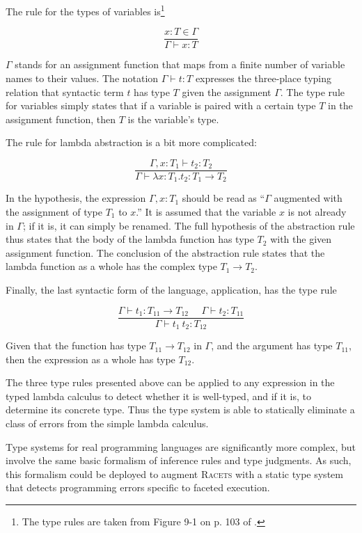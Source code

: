 \documentclass{article}
\begin{document}
The rule for the types of variables is\footnote{The type rules are taken from Figure 9-1 on p. 103 of \cite{types}.}

\[
\frac{x : T \in \Gamma}
{\Gamma \vdash x : T}
\]

$\Gamma$ stands for an assignment function that maps from a finite number of variable names to their values. The notation $\Gamma \vdash t : T$ expresses the three-place typing relation that syntactic term $t$ has type $T$ given the assignment $\Gamma$. The type rule for variables simply states that if a variable is paired with a certain type $T$ in the assignment function, then $T$ is the variable's type.

The rule for lambda abstraction is a bit more complicated:

\[
\frac{\Gamma, x : T_1 \vdash t_2 : T_2}
{\Gamma \vdash \lambda x : T_1 . t_2 : T_1 \to T_2}
\]

In the hypothesis, the expression $\Gamma, x : T_1$ should be read as ``$\Gamma$ augmented with the assignment of type $T_1$ to $x$.'' It is assumed that the variable $x$ is not already in $\Gamma$; if it is, it can simply be renamed. The full hypothesis of the abstraction rule thus states that the body of the lambda function has type $T_2$ with the given assignment function. The conclusion of the abstraction rule states that the lambda function as a whole has the complex type $T_1 \to T_2$.

Finally, the last syntactic form of the language, application, has the type rule

\[
\frac{\Gamma \vdash t_1 : T_{11} \to T_{12}\ \ \ \ \ \ \Gamma \vdash t_2 : T_{11}}
{\Gamma \vdash t_1\ t_2 : T_{12}}
\]

Given that the function has type $T_{11} \to T_{12}$ in $\Gamma$, and the argument has type $T_{11}$, then the expression as a whole has type $T_{12}$.

The three type rules presented above can be applied to any expression in the typed lambda calculus to detect whether it is well-typed, and if it is, to determine its concrete type. Thus the type system is able to statically eliminate a class of errors from the simple lambda calculus.

Type systems for real programming languages are significantly more complex, but involve the same basic formalism of inference rules and type judgments. As such, this formalism could be deployed to augment \textsc{Racets} with a static type system that detects programming errors specific to faceted execution.
\end{document}

